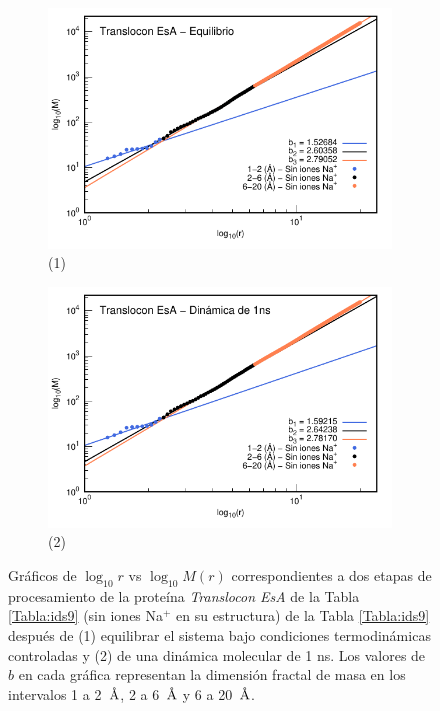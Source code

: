 	
	\begin{figure}[H]
		\centering
		\begin{subfigure}{0.49\textwidth}
			\centering
			\includegraphics[width=\linewidth,page=1]{graphs/PDBs/7khw/ions/7khwEq-oions.pdf}
			\caption{(1)}
		\end{subfigure}
		\hfill
		\begin{subfigure}{0.49\textwidth}
			\centering
			\includegraphics[width=\linewidth,page=1]{graphs/PDBs/7khw/ions/7khw1ns-oions.pdf}
			\caption{(2)}
		\end{subfigure}
		\caption{Gr\'{a}ficos de $\log_{10}r$ vs $\log_{10}M(r)$ correspondientes a dos etapas de procesamiento de la prote\'{i}na \textit{Translocon EsA} de la Tabla \ref{Tabla:ids9} (sin iones Na$^{+}$ en su estructura) de la Tabla \ref{Tabla:ids9} despu\'{e}s de (1) equilibrar el sistema bajo condiciones termodin\'{a}micas controladas y (2) de una din\'{a}mica molecular de 1 ns. Los valores de $b$ en cada gr\'{a}fica representan la dimensi\'{o}n fractal de masa en los intervalos 1 a 2~$\textup{\r{A}}$, 2 a 6~$\textup{\r{A}}$ y 6 a 20~$\textup{\r{A}}$.}
		\label{fig:7khw-oions}
	\end{figure}
	
